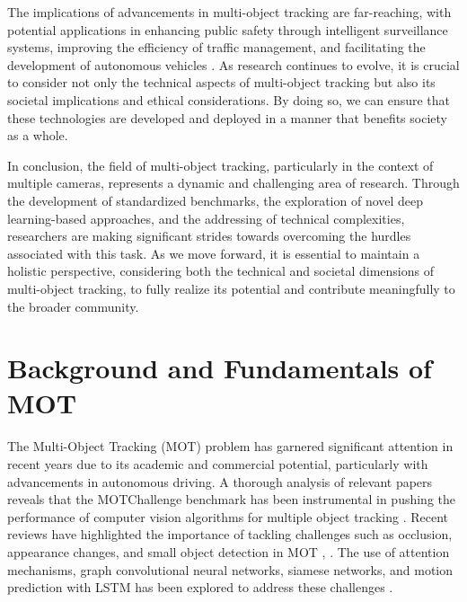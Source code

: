 \documentclass[conference]{IEEEtran}
\begin{document}
The implications of advancements in multi-object tracking are far-reaching, with potential applications in enhancing public safety through intelligent surveillance systems, improving the efficiency of traffic management, and facilitating the development of autonomous vehicles \cite{MOTChallenge}. As research continues to evolve, it is crucial to consider not only the technical aspects of multi-object tracking but also its societal implications and ethical considerations. By doing so, we can ensure that these technologies are developed and deployed in a manner that benefits society as a whole.

In conclusion, the field of multi-object tracking, particularly in the context of multiple cameras, represents a dynamic and challenging area of research. Through the development of standardized benchmarks, the exploration of novel deep learning-based approaches, and the addressing of technical complexities, researchers are making significant strides towards overcoming the hurdles associated with this task. As we move forward, it is essential to maintain a holistic perspective, considering both the technical and societal dimensions of multi-object tracking, to fully realize its potential and contribute meaningfully to the broader community.

\section{Background and Fundamentals of MOT}
The Multi-Object Tracking (MOT) problem has garnered significant attention in recent years due to its academic and commercial potential, particularly with advancements in autonomous driving. A thorough analysis of relevant papers reveals that the MOTChallenge benchmark has been instrumental in pushing the performance of computer vision algorithms for multiple object tracking \cite{MOTChallenge: A Benchmark for Multi-Object Tracking}. Recent reviews have highlighted the importance of tackling challenges such as occlusion, appearance changes, and small object detection in MOT \cite{Multiple Object Tracking: A Review}, \cite{A Comprehensive Review of Multiple Object Tracking Techniques}. The use of attention mechanisms, graph convolutional neural networks, siamese networks, and motion prediction with LSTM has been explored to address these challenges \cite{Multiple Object Tracking: A Review}.
\end{document}
